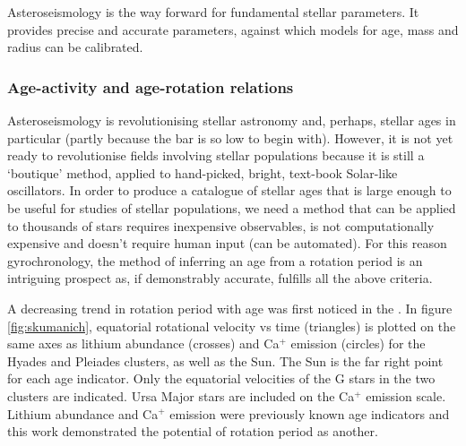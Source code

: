 Asteroseismology is the way forward for fundamental stellar parameters.
It provides precise and accurate parameters, against which models for age,
mass and radius can be calibrated.

\subsubsection*{Age-activity and age-rotation relations}

Asteroseismology is revolutionising stellar astronomy and, perhaps, stellar
ages in particular (partly because the bar is so low to begin with).
However, it is not yet ready to  revolutionise fields involving stellar
populations because it is still a `boutique' method, applied to hand-picked,
bright, text-book Solar-like oscillators.
In order to produce a catalogue of stellar ages that is large enough to be
useful for studies of stellar populations, we need a method that can be
applied to thousands of stars \ie requires inexpensive observables, is not
computationally expensive and doesn't require human input (can be automated).
For this reason gyrochronology, the method of inferring an age from a rotation
period is an intriguing prospect as, if demonstrably accurate, fulfills all
the above criteria.

A decreasing trend in rotation period with age was first noticed in the
\citet{skumanich1972}.
In figure \ref{fig:skumanich}, equatorial rotational velocity vs time
(triangles) is plotted on the same axes as lithium abundance (crosses) and
Ca$^+$ emission (circles) for the Hyades and Pleiades clusters, as well as the
Sun.
The Sun is the far right point for each age indicator.
Only the equatorial velocities of the G stars in the two clusters are
indicated.
Ursa Major stars are included on the Ca$^+$ emission scale.
Lithium abundance and Ca$^+$ emission were previously known age indicators and
this work demonstrated the potential of rotation period as another.

